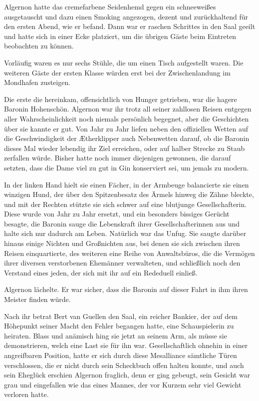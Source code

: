 \bigpar

Algernon hatte das cremefarbene Seidenhemd gegen ein schneeweißes
ausgetauscht und dazu einen Smoking angezogen, dezent und
zurückhaltend für den ersten Abend, wie er befand. Dann war er
raschen Schrittes in den Saal geeilt und hatte sich in einer Ecke
platziert, um die übrigen Gäste beim Eintreten beobachten zu
können.

Vorläufig waren es nur sechs Stühle, die um einen Tisch aufgestellt
waren. Die weiteren Gäste der ersten Klasse würden erst bei der
Zwischenlandung im Mondhafen zusteigen.

\bigpar

Die erste die hereinkam, offensichtlich von Hunger getrieben, war
die hagere Baronin Hohenschön. Algernon war ihr trotz all seiner
zahllosen Reisen entgegen aller Wahrscheinlichkeit noch niemals
persönlich begegnet, aber die Geschichten über sie kannte er gut.
Von Jahr zu Jahr liefen neben den offiziellen Wetten auf die
Geschwindigkeit der Ætherklipper auch Nebenwetten darauf, ob die
Baronin dieses Mal wieder lebendig ihr Ziel erreichen, oder auf
halber Strecke zu Staub zerfallen würde. Bisher hatte noch immer
diejenigen gewonnen, die darauf setzten, dass die Dame viel zu gut
in Gin konserviert sei, um jemals zu modern.

In der linken Hand hielt sie einen Fächer, in der Armbeuge
balancierte sie einen winzigen Hund, der über den Spitzenbesatz des
Ärmels hinweg die Zähne bleckte, und mit der Rechten stützte sie
sich schwer auf eine blutjunge Gesellschafterin. Diese wurde von
Jahr zu Jahr ersetzt, und ein besonders bissiges Gerücht besagte,
die Baronin sauge die Lebenskraft ihrer Gesellschafterinnen aus und
halte sich nur dadurch am Leben. Natürlich war das Unfug. Sie
saugte darüber hinaus einige Nichten und Großnichten aus, bei denen
sie sich zwischen ihren Reisen einquartierte, des weiteren eine
Reihe von Anwaltsbüros, die die Vermögen ihrer diversen
verstorbenen Ehemänner verwalteten, und schließlich noch den
Verstand eines jeden, der sich mit ihr auf ein Rededuell einließ.

Algernon lächelte. Er war sicher, dass die Baronin auf dieser Fahrt
in ihm ihren Meister finden würde.

\bigpar

Nach ihr betrat Bert van Guellen den Saal, ein reicher Bankier, der
auf dem Höhepunkt seiner Macht den Fehler begangen hatte, eine
Schauspielerin zu heiraten. Blass und anämisch hing sie jetzt an
seinem Arm, als müsse sie demonstrieren, welch eine Last sie für
ihn war. Gesellschaftlich ohnehin in einer angreifbaren Position,
hatte er sich durch diese Mesalliance sämtliche Türen verschlossen,
die er nicht durch sein Scheckbuch offen halten konnte, und auch
sein Eheglück erschien Algernon fraglich, denn er ging gebeugt,
sein Gesicht war grau und eingefallen wie das eines Mannes, der vor
Kurzem sehr viel Gewicht verloren hatte.

